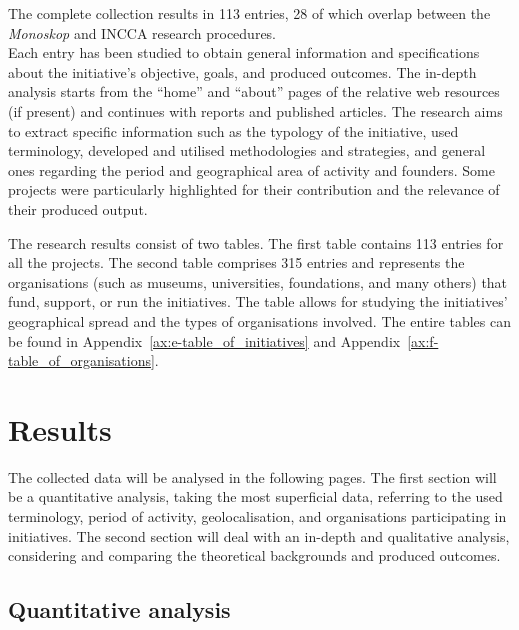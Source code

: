 The complete collection results in 113 entries, 28 of which overlap between the \textit{Monoskop} and INCCA research procedures.\\
\newline
Each entry has been studied to obtain general information and specifications about the initiative’s objective, goals, and produced outcomes. The in-depth analysis starts from the ``home'' and ``about'' pages of the relative web resources (if present) and continues with reports and published articles. The research aims to extract specific information such as the typology of the initiative, used terminology, developed and utilised methodologies and strategies, and general ones regarding the period and geographical area of activity and founders. Some projects were particularly highlighted for their contribution and the relevance of their produced output.

The research results consist of two tables. The first table contains 113 entries for all the projects. The second table comprises 315 entries and represents the organisations (such as museums, universities, foundations, and many others) that fund, support, or run the initiatives. The table allows for studying the initiatives' geographical spread and the types of organisations involved. The entire tables can be found in Appendix~\ref{ax:e-table_of_initiatives} and Appendix~\ref{ax:f-table_of_organisations}.


\section{Results}
The collected data will be analysed in the following pages. The first section will be a quantitative analysis, taking the most superficial data, referring to the used terminology, period of activity, geolocalisation, and organisations participating in initiatives. The second section will deal with an in-depth and qualitative analysis, considering and comparing the theoretical backgrounds and produced outcomes. 


\subsection{Quantitative analysis}

